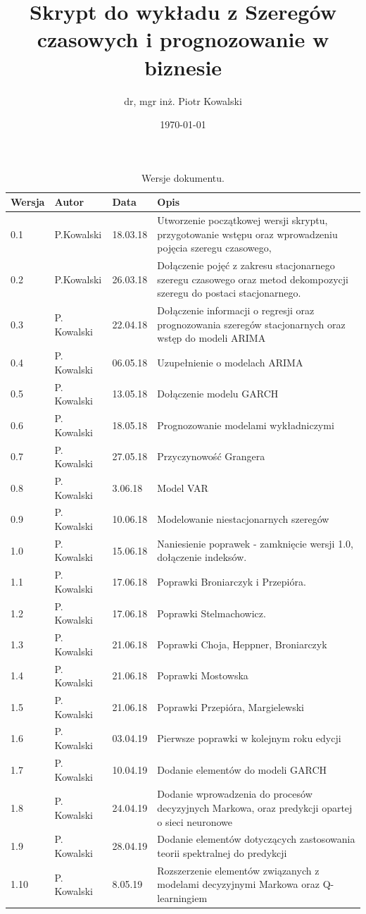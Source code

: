 \documentclass[10pt,a4paper]{book}
\author{dr, mgr inż. Piotr Kowalski}
\title{Skrypt do wykładu z Szeregów czasowych i prognozowanie w biznesie}
\date{\today}
\begin{document}
\begin{titlepage}
\maketitle
\end{titlepage}
\FloatBarrier

\begin{table}[h]
\centering
\begin{tabular}{|p{1cm}|p{2cm}|p{12mm}|p{12cm}|}\hline
Wersja & Autor & Data & Opis\\\hline
0.1 & P.Kowalski & 18.03.18& Utworzenie początkowej wersji skryptu, przygotowanie wstępu oraz wprowadzeniu pojęcia szeregu czasowego,\\\hline
0.2 & P.Kowalski & 26.03.18& Dołączenie pojęć z zakresu stacjonarnego szeregu czasowego oraz metod dekompozycji szeregu do postaci stacjonarnego.\\\hline
0.3 & P. Kowalski & 22.04.18 & Dołączenie informacji o regresji oraz prognozowania szeregów stacjonarnych oraz wstęp do modeli ARIMA \\\hline
0.4 & P. Kowalski & 06.05.18 & Uzupełnienie o modelach ARIMA \\\hline
0.5 & P. Kowalski & 13.05.18 & Dołączenie modelu GARCH \\\hline
0.6 & P. Kowalski & 18.05.18 & Prognozowanie modelami wykładniczymi \\\hline
0.7 & P. Kowalski & 27.05.18 & Przyczynowość Grangera \\\hline
0.8 & P. Kowalski & 3.06.18 & Model VAR \\\hline
0.9 & P. Kowalski & 10.06.18 & Modelowanie niestacjonarnych szeregów \\\hline
1.0 & P. Kowalski & 15.06.18 & Naniesienie poprawek - zamknięcie wersji 1.0, dołączenie indeksów. \\\hline
1.1 & P. Kowalski & 17.06.18 & Poprawki Broniarczyk i Przepióra. \\\hline
1.2 & P. Kowalski & 17.06.18 & Poprawki Stelmachowicz. \\\hline
1.3 & P. Kowalski & 21.06.18 & Poprawki Choja, Heppner, Broniarczyk  \\\hline
1.4 & P. Kowalski & 21.06.18 & Poprawki Mostowska  \\\hline
1.5 & P. Kowalski & 21.06.18 & Poprawki Przepióra, Margielewski  \\\hline
1.6 & P. Kowalski & 03.04.19 & Pierwsze poprawki w kolejnym roku edycji \\\hline
1.7 & P. Kowalski & 10.04.19 & Dodanie elementów do modeli GARCH \\\hline
1.8 & P. Kowalski & 24.04.19 & Dodanie wprowadzenia do procesów decyzyjnych Markowa, oraz predykcji opartej o sieci neuronowe \\\hline
1.9 & P. Kowalski & 28.04.19 & Dodanie elementów dotyczących zastosowania teorii spektralnej do predykcji \\\hline
1.10 & P. Kowalski & 8.05.19 & Rozszerzenie elementów związanych z modelami decyzyjnymi Markowa oraz Q-learningiem \\\hline
\end{tabular}
\caption{Wersje dokumentu.}
\end{table}
\FloatBarrier
\end{document}
